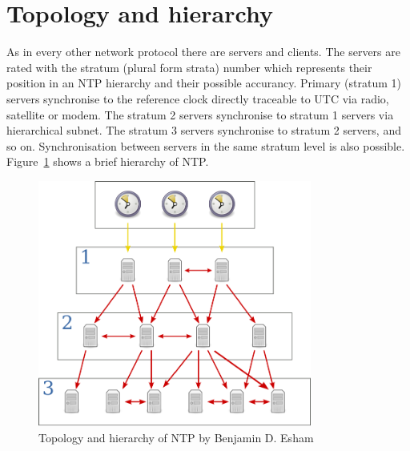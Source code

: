 
\section{Topology and hierarchy}
As in every other network protocol there are servers and clients.
The servers are rated with the stratum (plural form strata) number which represents their position
in an NTP hierarchy and their possible accurancy.
Primary (stratum 1) servers synchronise to the reference clock directly traceable to UTC via
radio, satellite or modem.
The stratum 2 servers synchronise to stratum 1
servers via hierarchical subnet.
The stratum 3 servers synchronise to stratum 2 servers, and so on.
Synchronisation between servers in the same stratum level is also possible.
Figure~\ref{fig:ntp-hierarchy} shows a brief hierarchy of NTP.
\begin{figure}
  \centering
  \includegraphics[width=9cm,keepaspectratio]{fig/Network_Time_Protocol_servers_and_clients.pdf}
  \caption{Topology and hierarchy of NTP by Benjamin D. Esham}
  \label{fig:ntp-hierarchy}
  \bigskip
\end{figure}

